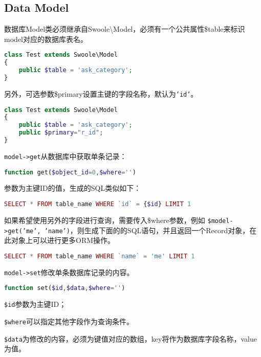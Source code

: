 \subsection{Data Model}




数据库Model类必须继承自Swoole\textbackslash Model，必须有一个公共属性\$table来标识model对应的数据库表名。



\begin{lstlisting}[language=PHP]
class Test extends Swoole\Model
{
	public $table = 'ask_category';
}
\end{lstlisting}

另外，可选参数\$primary设置主键的字段名称，默认为\texttt{'id'}。

\begin{lstlisting}[language=PHP]
class Test extends Swoole\Model
{
	public $table = 'ask_category';
	public $primary="r_id";
}

\end{lstlisting}

\texttt{model->get}从数据库中获取单条记录：

\begin{lstlisting}[language=PHP]
function get($object_id=0,$where='')
\end{lstlisting}

参数为主键ID的值，生成的SQL类似如下：


\begin{lstlisting}[language=PHP]
SELECT * FROM table_name WHERE `id` = {$id} LIMIT 1
\end{lstlisting}

如果希望使用另外的字段进行查询，需要传入\$where参数，例如 \texttt{\$model->get('me', 'name')}，则生成下面的的SQL语句，并且返回一个Record对象，在此对象上可以进行更多ORM操作。

\begin{lstlisting}[language=PHP]
SELECT * FROM table_name WHERE `name` = 'me' LIMIT 1
\end{lstlisting}

\texttt{model->set}修改单条数据库记录的内容。


\begin{lstlisting}[language=PHP]
function set($id,$data,$where='')
\end{lstlisting}

\begin{compactitem}
\item \texttt{\$id}参数为主键ID；
\item \texttt{\$where}可以指定其他字段作为查询条件。
\item \texttt{\$data}为修改的内容，必须为键值对应的数组，key将作为数据库字段名称，value为值。
\end{compactitem}


